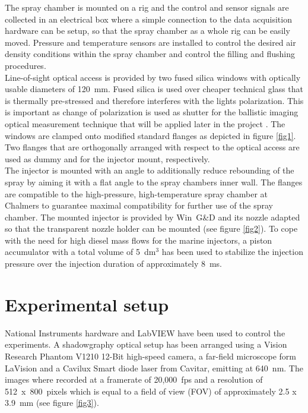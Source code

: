 \documentclass[letterpaper,twocolumn,10pt]{ilass}
\begin{document}
The spray chamber is mounted on a rig and the control and sensor signals are collected in an
electrical box where a simple connection to the data acquisition hardware can be setup, so
that the spray chamber as a whole rig can be easily moved. 
Pressure and temperature sensors are installed to control the desired air density conditions
within the spray chamber and control the filling and flushing procedures.\\
%
Line-of-sight optical access is provided by two fused silica windows with optically usable
diameters of 120~mm. Fused silica is used over cheaper technical glass that is thermally
pre-stressed and therefore interferes with the lights polarization. This is important as
change of polarization is used as shutter for the ballistic imaging optical measurement
technique that will be applied later in the project \cite{Linne2013}. The windows are clamped
onto modified standard flanges as depicted in figure \ref{fig1}. Two flanges that are
orthogonally arranged with respect to the optical access are used as dummy and for the
injector mount, respectively. \\
%
The injector is mounted with an angle to additionally reduce rebounding of the spray by
aiming it with a flat angle to the spray chambers inner wall. The flanges are compatible
to the high-pressure, high-temperature spray chamber at Chalmers to guarantee maximal
compatibility for further use of the spray chamber. The mounted injector is provided
by Win~G\&D and its nozzle adapted so that the transparent nozzle holder can be mounted
(see figure \ref{fig2}). To cope with the need for high diesel mass flows for the marine
injectors, a piston accumulator with a total volume of 5~dm$^3$ has been used to stabilize
the injection pressure over the injection duration of approximately 8~ms. 


\section*{Experimental setup}
National Instruments hardware and LabVIEW have been used to control the experiments.
A shadowgraphy optical setup has been arranged using a Vision Research Phantom V1210
12-Bit high-speed camera, a far-field microscope form LaVision and a Cavilux Smart
diode laser from Cavitar, emitting at 640~nm. The images where recorded at a framerate of
20,000~fps and a resolution of 512~x~800~pixels which is equal to a field of view (FOV)
of approximately 2.5 x 3.9~mm (see figure \ref{fig3}). 
\end{document}
